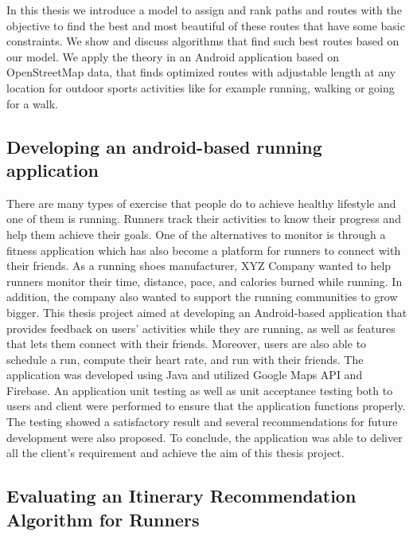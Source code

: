     In this thesis we introduce a model to assign and rank paths and routes with
    the objective to find the best and most beautiful of these routes that have some
    basic constraints. We show and discuss algorithms that find such best routes
    based on our model. We apply the theory in an Android application based on
    OpenStreetMap data, that finds optimized routes with adjustable length at any
    location for outdoor sports activities like for example running, walking or going
    for a walk.

    \subsection{Developing an android-based running application}

    There are many types of exercise that people do to achieve healthy lifestyle and one of them is running. Runners track their activities to
    know their progress and help them achieve their goals. One of the alternatives to monitor is through a fitness application which has also
    become a platform for runners to connect with their friends. As a running shoes manufacturer, XYZ Company wanted to help runners
    monitor their time, distance, pace, and calories burned while running. In addition, the company also wanted to support the running
    communities to grow bigger. This thesis project aimed at developing an Android-based application that provides feedback on users’
    activities while they are running, as well as features that lets them connect with their friends. Moreover, users are also able to schedule a
    run, compute their heart rate, and run with their friends. The application was developed using Java and utilized Google Maps API and
    Firebase. An application unit testing as well as unit acceptance testing both to users and client were performed to ensure that the
    application functions properly. The testing showed a satisfactory result and several recommendations for future development were
    also proposed. To conclude, the application was able to deliver all the client’s requirement and achieve the aim of this thesis project.

    \subsection{Evaluating an Itinerary Recommendation Algorithm for Runners}

